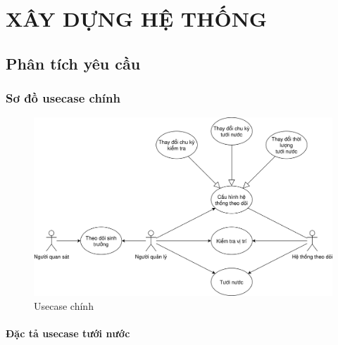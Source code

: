 \chapter{XÂY DỰNG HỆ THỐNG}
\section{Phân tích yêu cầu}

\subsection{Sơ đồ usecase chính}


\begin{figure}[h]
	\centering
	\includegraphics[width=\linewidth]{images/main-usecase}
	\caption{Usecase chính}
	\label{fig:main-usecase}
\end{figure}

\subsubsection{Đặc tả usecase tưới nước}

